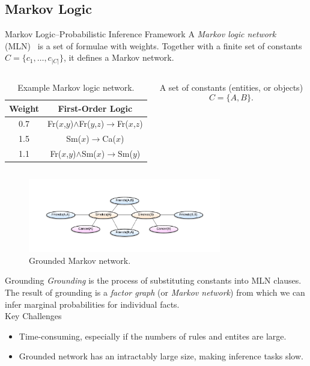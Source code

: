 \documentclass[onlymath,xcolor=pdftex,dvipsnames,table]{beamer}
\let\oldemph\emph
\renewcommand{\emph}[1]{{\color{Blue}\oldemph{#1}}}
\newcommand{\head}[1]{{\large\color{OliveGreen}#1\\[2pt]}}
\begin{document}
\subsection{Markov Logic}
\begin{frame}{Markov Logic--Probabilistic Inference Framework}
A \emph{Markov logic network} (MLN)~\cite{richardson2006markov} is a set of formulae with weights. Together with a finite set of constants $C=\{c_1,\ldots,c_{\left\vert C\right\vert}\}$, it defines a Markov network.

\begin{columns}[c]
  \begin{table}\tiny
    \centering
    \begin{tabular}{cc}\toprule
      \textbf{Weight} & \textbf{First-Order Logic}\\\midrule
      0.7 & Fr($x$,$y$)$\wedge$Fr($y$,$z$)$\rightarrow$Fr($x$,$z$)\\
      1.5 & Sm($x$)$\rightarrow$Ca($x$)\\
      1.1 & Fr($x$,$y$)$\wedge$Sm($x$)$\rightarrow$Sm($y$)\\
      \bottomrule
    \end{tabular}
    \caption{Example Markov logic network.}
    \label{tab:mln}
  \end{table}

  A set of constants (entities, or objects) $$C=\{A,B\}.$$
\end{columns}\vspace{-25pt}
\begin{figure}
  \centering
  \includegraphics[clip,trim=40 35 40 40,width=0.75\textwidth]{mrf.pdf}
  \caption{Grounded Markov network.}
  \label{fig:ground}
\end{figure}
\end{frame}


\begin{frame}{Grounding}
\emph{Grounding} is the process of substituting constants into MLN clauses.\\[5pt]

The result of grounding is a \emph{factor graph} (or \emph{Markov network}) from which we can infer marginal probabilities for individual facts.\\[15pt]

\head{Key Challenges}
\begin{itemize}
  \item Time-consuming, especially if the numbers of rules and entites are large.
  \item Grounded network has an intractably large size, making inference tasks slow.
\end{itemize}
\end{frame}
\end{document}
